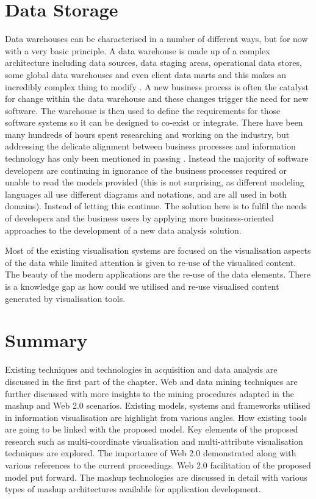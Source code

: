 \section{Data Storage}

Data warehouses can be characterised in a number of different ways, but for now with a very basic principle. A data warehouse is made up of a complex architecture including data sources, data staging areas, operational data stores, some global data warehouses and even client data marts and this makes an incredibly complex thing to modify \cite{berg2004qualitative}. A new business process is often the catalyst for change within the data warehouse and these changes trigger the need for new software. The warehouse is then used to define the requirements for those software systems so it can be designed to co-exist or integrate. There have been many hundreds of hours spent researching and working on the industry, but addressing the delicate alignment between business processes and information technology has only been mentioned in passing \cite{rabl2012solving}. Instead the majority of software developers are continuing in ignorance of the business processes required or unable to read the models provided (this is not surprising, as different modeling languages all use different diagrams and notations, and are all used in both domains). Instead of letting this continue. The solution here is to fulfil the needs of developers and the business users by applying more business-oriented approaches to the development of a new data analysis solution.

Most of the existing visualisation systems \cite{fry,north2000snap,spotfire,tableau} are focused on the visualisation aspects of the data while limited attention is given to re-use of the visualised content. The beauty of the modern applications are the re-use of the data elements. There is a knowledge gap as how could we utilised and re-use visualised content generated by visualisation tools.

\section{Summary}

Existing techniques and technologies in acquisition and data analysis are discussed in the first part of the chapter. Web and data mining techniques are further discussed with more insights to the mining procedures adapted in the mashup and Web 2.0 scenarios. Existing models, systems and frameworks utilised in information visualisation are highlight from various angles. How existing tools are going to be linked with the proposed model. Key elements of the proposed research such as multi-coordinate visualisation and multi-attribute visualisation techniques are explored. The importance of Web 2.0 demonstrated along with various references to the current proceedings. Web 2.0 facilitation of the proposed model put forward. The mashup technologies are discussed in detail with various types of mashup architectures available for application development. 

